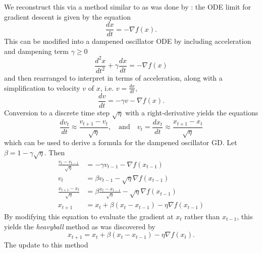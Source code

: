 \documentclass{article}
\newcommand{\dv}[2]{\frac{d #1}{d #2}}
\begin{document}
We reconstruct this via a method similar to as was done by
\citeauthor{10.1214/18-EJS1395}: the ODE limit for gradient descent is given by
the equation
\begin{equation}
    \dv{x}{t} = -\nabla f(x).
\end{equation}
This can be modified into a dampened oscillator ODE by including acceleration
and dampening term $\gamma \geq 0$
\begin{equation}
    \dv{^2 x}{t^2}  + \gamma \dv{x}{t} = -\nabla f(x)
\end{equation}
and then rearranged to interpret in terms of acceleration, along with a
simplification to velocity $v$ of $x$, i.e.  $v = \dv{x}{t}$,
\begin{equation}
    \dv{v}{t}  =  -\gamma v -\nabla f(x).
\end{equation}
Conversion to a discrete time step $\sqrt{\eta}$ with a right-derivative yields the equations
\begin{equation}
    \label{eq:der}
    \dv{v_t}{t} \approx \frac{v_{t + 1} - v_t}{\sqrt{\eta}}, \quad \text{and}
    \quad v_{t} = \dv{x_t}{t} \approx \frac{x_{t + 1} - x_t}{\sqrt{\eta}}
\end{equation}
which can be used to derive a formula for the dampened oscillator GD. Let $\beta
= 1 - \gamma \sqrt{\eta}$. Then 
\begin{equation}
    \label{eq:formula}
    \begin{aligned}
        \frac{v_{t} - v_{t - 1}}{\sqrt{\eta}} &= -\gamma v_{t - 1} -\nabla
        f(x_{t - 1}) \\
        v_{t} &= \beta v_{t - 1} - \sqrt{\eta} \nabla f(x_{t - 1})\\
        \frac{x_{t + 1} - x_t}{\sqrt{\eta}} &= \beta \frac{x_{t}
        - x_{t - 1}}{\sqrt{\eta}} - \sqrt{\eta} \nabla f(x_{t - 1}) \\
        x_{t + 1} &= x_t + \beta (x_{t} - x_{t - 1}) - \eta \nabla f(x_{t - 1})
    \end{aligned}
\end{equation}
By modifying this equation to evaluate the gradient at $x_t$ rather
than $x_{t - 1}$, this yields the \emph{heavyball} method as was discovered by
\citeauthor{heavyball}
\begin{equation}
    \label{eq:heavyball}
        x_{t + 1} = x_t + \beta (x_{t} - x_{t - 1}) - \eta \nabla f(x_t).
\end{equation}
The update to this method
\end{document}

